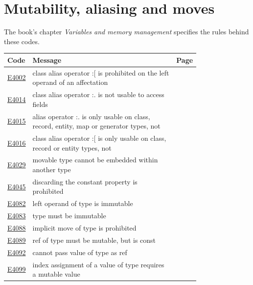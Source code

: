 
\clearpage
\section{Mutability, aliasing and moves}
\label{sec:codes:memory}

The book's chapter \textit{Variables and memory management} specifies the rules behind these codes.

\begin{longtable}{@{}l p{0.78\linewidth} r@{}}
\toprule Code & Message & Page\\ \midrule \endhead
\hyperref[sec:codes:e4002]{E4002} & class alias operator :[ is prohibited on the left operand of an affectation & \pageref{sec:codes:e4002}\\
\hyperref[sec:codes:e4014]{E4014} & class alias operator :. is not usable to access fields & \pageref{sec:codes:e4014}\\
\hyperref[sec:codes:e4015]{E4015} & alias operator :. is only usable on class, record, entity, map or generator types, not \errhole{} & \pageref{sec:codes:e4015}\\
\hyperref[sec:codes:e4016]{E4016} & class alias operator :[ is only usable on class, record or entity types, not \errhole{} & \pageref{sec:codes:e4016}\\
\hyperref[sec:codes:e4029]{E4029} & movable type \errhole{} cannot be embedded within another type & \pageref{sec:codes:e4029}\\
\hyperref[sec:codes:e4045]{E4045} & discarding the constant property is prohibited & \pageref{sec:codes:e4045}\\
\hyperref[sec:codes:e4082]{E4082} & left operand of type \errhole{} is immutable & \pageref{sec:codes:e4082}\\
\hyperref[sec:codes:e4083]{E4083} & type must be immutable & \pageref{sec:codes:e4083}\\
\hyperref[sec:codes:e4088]{E4088} & implicit move of type \errhole{} is prohibited & \pageref{sec:codes:e4088}\\
\hyperref[sec:codes:e4089]{E4089} & ref of type \errhole{} must be mutable, but is const & \pageref{sec:codes:e4089}\\
\hyperref[sec:codes:e4092]{E4092} & cannot pass value of type \errhole{} as ref & \pageref{sec:codes:e4092}\\
\hyperref[sec:codes:e4099]{E4099} & index assignment of a value of type \errhole{} requires a mutable value & \pageref{sec:codes:e4099}\\

\end{longtable}

